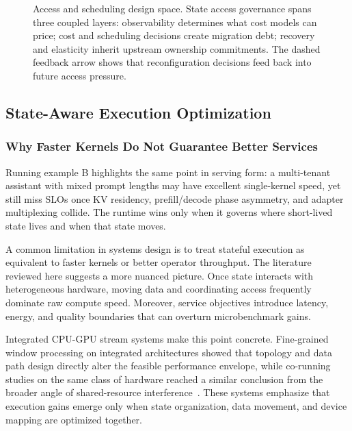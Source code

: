 \documentclass[acmsmall,screen,review]{acmart}
\begin{document}
\begin{figure}[t]
\centering
\resizebox{0.94\textwidth}{!}{}
\caption{Access and scheduling design space. State access governance spans three coupled layers: observability determines what cost models can price; cost and scheduling decisions create migration debt; recovery and elasticity inherit upstream ownership commitments. The dashed feedback arrow shows that reconfiguration decisions feed back into future access pressure.}
\label{fig:access-designspace}
\end{figure}

\subsection{State-Aware Execution Optimization}

\subsubsection{Why Faster Kernels Do Not Guarantee Better Services}

Running example B highlights the same point in serving form: a multi-tenant assistant with mixed prompt lengths may have excellent single-kernel speed, yet still miss SLOs once KV residency, prefill/decode phase asymmetry, and adapter multiplexing collide. The runtime wins only when it governs where short-lived state lives and when that state moves.

A common limitation in systems design is to treat stateful execution as equivalent to faster kernels or better operator throughput. The literature reviewed here suggests a more nuanced picture. Once state interacts with heterogeneous hardware, moving data and coordinating access frequently dominate raw compute speed. Moreover, service objectives introduce latency, energy, and quality boundaries that can overturn microbenchmark gains.

Integrated CPU-GPU stream systems make this point concrete. Fine-grained window processing on integrated architectures showed that topology and data path design directly alter the feasible performance envelope, while co-running studies on the same class of hardware reached a similar conclusion from the broader angle of shared-resource interference~\cite{zhang2020finestream,zhang2016corun,zhang2016elastic}. These systems emphasize that execution gains emerge only when state organization, data movement, and device mapping are optimized together.
\end{document}
